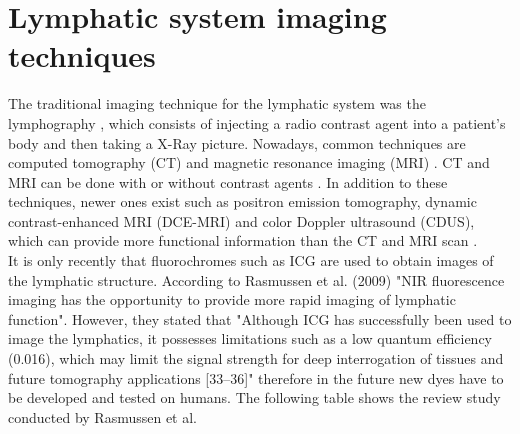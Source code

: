 \section{Lymphatic system imaging techniques}
The traditional imaging technique for the lymphatic system was the lymphography \cite{guermazi_lymphography:_2003}, which consists of injecting a radio contrast agent into a patient's body and then taking a X-Ray picture.  Nowadays, common techniques are computed tomography (CT) and magnetic resonance imaging (MRI) \cite{guermazi_lymphography:_2003,reinhardt_metastatic_2001}. CT and MRI can be done with or without contrast agents \cite{luciani_lymph_2006}. In addition to these techniques, newer ones exist such as positron emission tomography, dynamic contrast-enhanced MRI (DCE-MRI) and color Doppler ultrasound (CDUS), which can provide more functional information than the CT and MRI scan \cite{barrett_imaging_2006}. \\

It is only recently that fluorochromes such as ICG are used to obtain images of the lymphatic structure. According to Rasmussen et al. (2009) \cite{rasmussen_lymphatic_2009} "NIR fluorescence imaging has the opportunity to provide more rapid imaging of lymphatic function". However, they stated that "Although ICG has successfully been used to image the lymphatics, it possesses limitations such as a low quantum efficiency (0.016), which may limit the signal strength for deep interrogation of tissues and future tomography applications [33–36]" therefore in the future new dyes have to be developed and tested on humans. The following table shows the review study conducted by Rasmussen et al. \cite{rasmussen_lymphatic_2009}

